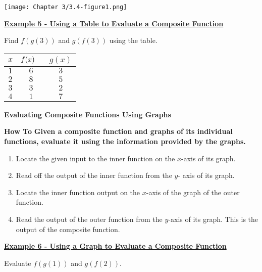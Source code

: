 \documentclass[12pt]{book}
\begin{document}
\centerline{ \texttt{[image: Chapter 3/3.4-figure1.png]} }

\vspace{1mm}
\underline{\textbf{Example 5 - Using a Table to Evaluate a Composite Function}}

Find $f(g(3))$ and $g(f(3))$ using the table.
\\

\begin{tabular}{ |c|c|c| } 
 \hline
 $x$ & \hspace{3mm} $f(x) \hspace{3mm}$ & \hspace{3mm} $g(x)$ \hspace{3mm} \\
 \hline
 $1$ & $6$ & $3$ \\
 \hline
 $2$ & $8$ & $5$ \\
 \hline
 $3$ & $3$ & $2$ \\
 \hline
  $4$ & $1$ & $7$ \\
 \hline
\end{tabular}
\newpage


\textbf{Evaluating Composite Functions Using Graphs}



\begin{boxR}
    \textbf{How To}
    \vspace{1mm}
    \hline
    \vspace{2mm}
   \textbf{Given a composite function and graphs of its individual functions, evaluate it using the information provided by the graphs.}
   \begin{enumerate}
       \item Locate the given input to the inner function on the $x$-axis of its graph.
       \item Read off the output of the inner function from the  $y$-
       axis of its graph.
       \item Locate the inner function output on the $x$-axis of the graph of the outer function.
       \item Read the output of the outer function from the  $y$-axis of its graph. This is the output of the composite function.
   \end{enumerate}
\end{boxR}

  
\underline{\textbf{Example 6 - Using a Graph to Evaluate a Composite Function}}

Evaluate $f(g(1))$ and $g(f(2))$.
\\
\end{document}
